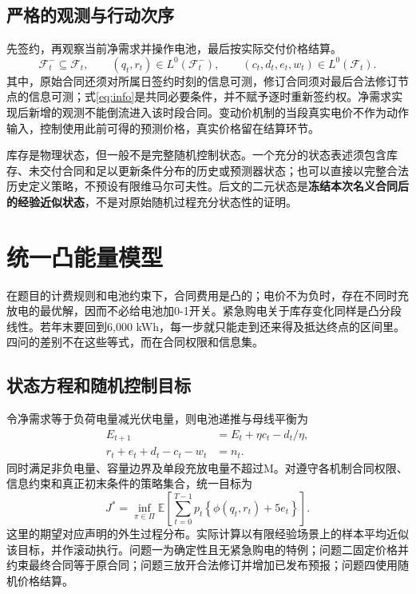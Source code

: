 \documentclass[UTF8,a4paper,zihao=-4,fontset=mac]{ctexart}
\newcommand{\E}{\mathbb E}
\begin{document}
\subsection{严格的观测与行动次序}
先签约，再观察当前净需求并操作电池，最后按实际交付价格结算。
\begin{equation}\label{eq:info}
 \mathcal F_t^-\subseteq\mathcal F_t,\qquad
 (q_t,r_t)\in L^0(\mathcal F_t^-),\qquad
 (c_t,d_t,e_t,w_t)\in L^0(\mathcal F_t).
\end{equation}
其中，原始合同还须对所属日签约时刻的信息可测，修订合同须对最后合法修订节点的信息可测；式\eqref{eq:info}是共同必要条件，并不赋予逐时重新签约权。净需求实现后新增的观测不能倒流进入该时段合同。变动价机制的当段真实电价不作为动作输入，控制使用此前可得的预测价格，真实价格留在结算环节。

库存是物理状态，但一般不是完整随机控制状态。一个充分的状态表述须包含库存、未交付合同和足以更新条件分布的历史或预测器状态；也可以直接以完整合法历史定义策略，不预设有限维马尔可夫性。后文的二元状态是\textbf{冻结本次名义合同后的经验近似状态}，不是对原始随机过程充分状态性的证明。

\section{统一凸能量模型}
在题目的计费规则和电池约束下，合同费用是凸的；电价不为负时，存在不同时充放电的最优解，因而不必给电池加0-1开关。紧急购电关于库存变化同样是凸分段线性。若年末要回到6,000 kWh，每一步就只能走到还来得及抵达终点的区间里。四问的差别不在这些等式，而在合同权限和信息集。

\subsection{状态方程和随机控制目标}
令净需求等于负荷电量减光伏电量，则电池递推与母线平衡为
\begin{align}
 E_{t+1}&=E_t+\eta c_t-d_t/\eta,\label{eq:state}\\
 r_t+e_t+d_t-c_t-w_t&=n_t.\label{eq:balance}
\end{align}
同时满足非负电量、容量边界及单段充放电量不超过M。对遵守各机制合同权限、信息约束和真正初末条件的策略集合，统一目标为
\begin{equation}\label{eq:mother}
 J^*=\inf_{\pi\in\Pi}\E\!\left[\sum_{t=0}^{T-1}p_t
 \left\{\phi(q_t,r_t)+5e_t\right\}\right].
\end{equation}
这里的期望对应声明的外生过程分布。实际计算以有限经验场景上的样本平均近似该目标\cite{kleywegt2002,shapiro2014}，并作滚动执行。问题一为确定性且无紧急购电的特例；问题二固定价格并约束最终合同等于原合同；问题三放开合法修订并增加已发布预报；问题四使用随机价格结算。
\end{document}
